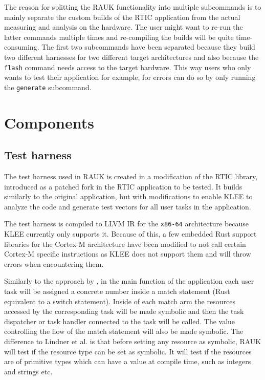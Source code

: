 The reason for splitting the RAUK functionality into multiple subcommands is to
mainly separate the custom builds of the RTIC application from the actual
measuring and analysis on the hardware. The user might want to re-run the latter
commands multiple times and re-compiling the builds will be quite
time-consuming. The first two subcommands have been separated because they
build two different harnesses for two different target architectures and also
because the \texttt{flash} command needs access to the target hardware. This
way users who only wants to test their application for example, for errors can do so by
only running the \texttt{generate} subcommand.

\section{Components}

\subsection{Test harness}
The test harness used in RAUK is created in a modification of the RTIC library,
introduced as a patched fork in the RTIC application to be tested. It builds
similarly to the original application, but with modifications to enable KLEE to
analyze the code and generate test vectors for all user tasks in the
application.

The test harness is compiled to LLVM IR for the \texttt{x86-64} architecture
because KLEE currently only supports it. Because of this, a few embedded Rust support
libraries for the Cortex-M architecture have been modified to not call certain
Cortex-M specific instructions as KLEE does not support them and will throw
errors when encountering them.

Similarly to the approach by \cite{lindner}, in the main function of the
application each user task will be assigned a concrete number inside a match
statement (Rust equivalent to a switch statement). Inside of each match arm the
resources accessed by the corresponding task will be made symbolic and then
the task dispatcher or task handler connected to the task will be called. The
value controlling the flow of the match statement will also be made symbolic.
The difference to Lindner et al. is that before setting any resource as
symbolic, RAUK will test if the resource type can be set as symbolic. It
will test if the resources are of primitive types which can have a value at
compile time, such as integers and strings etc.

